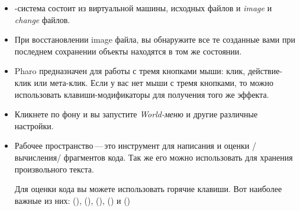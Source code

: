 \documentclass[a4paper,10pt,twoside]{book}
\begin{document}
\begin{itemize}
\item \pharo-система состоит из виртуальной машины, исходных файлов
и \emph{image} и \emph{change} файлов.

\item При восстановлении image файла, вы обнаружите все те созданные
вами при последнем сохранении объекты находятся в том же состоянии.

\item Pharo предназначен для работы с тремя кнопками мыши: клик,
действие-клик или мета-клик. Если у вас нет мыши с тремя кнопками,
то можно использовать клавиши-модификаторы для получения
того же эффекта.

\item Кликнете по фону \pharo и вы запустите \emph{World-меню}
и другие различные настройки.

\item Рабочее пространство\,---\,это инструмент для написания и оценки
/вычисления/ фрагментов кода. Так же его можно использовать для
хранения произвольного текста.

Для оценки кода вы можете использовать горячие клавиши. Вот наиболее
важные из них:  (),  (),
 (),  () и
 ()


\end{itemize}
\end{document}
